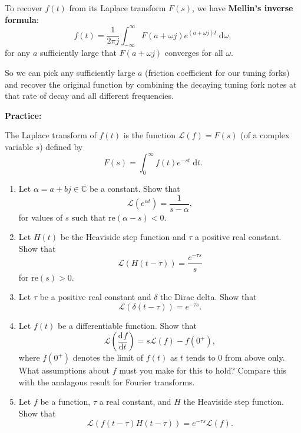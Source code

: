 \documentclass{article}
\newcommand{\deriv}[3][]{\frac{\mathrm{d}^{#1}#2}{\mathrm{d}#3^{#1}}}
\newcommand{\diff}{\;\mathrm{d}}
\begin{document}
To recover $f(t)$ from its Laplace transform $F(s)$, we have \textbf{Mellin's inverse formula}:
\[f(t)=\frac{1}{2\pi j}\int_{-\infty}^\infty F(a+\omega j)e^{(a+\omega j)t}\diff \omega,\]
for any $a$ sufficiently large that $F(a+\omega j)$ converges for all $\omega$.

So we can pick any sufficiently large $a$ (friction coefficient for our tuning forks) and recover the original function by combining the decaying tuning fork notes at that rate of decay and all different frequencies.


\clearpage
























\textbf{Practice:}\bigskip

The Laplace transform of $f(t)$ is the function $\mathcal{L}(f)=F(s)$ (of a complex variable $s$) defined by
\[F(s)=\int_0^\infty f(t)e^{-st}\diff t.\]

\begin{enumerate}
	\item Let $\alpha=a+bj\in\mathbb{C}$ be a constant. Show that
		\[\mathcal{L}\left(e^{\alpha t}\right)=\frac{1}{s-\alpha},\]
		for values of $s$ such that $\mathrm{re}(\alpha-s)<0$.
	\item Let $H(t)$ be the Heaviside step function and $\tau$ a positive real constant. Show that
		\[\mathcal{L}(H(t-\tau))=\frac{e^{-\tau s}}{s}\]
		for $\mathrm{re}(s)>0$.
	\item Let $\tau$ be a positive real constant and $\delta$ the Dirac delta. Show that
		\[\mathcal{L}(\delta(t-\tau))=e^{-\tau s}.\]
	\item Let $f(t)$ be a differentiable function. Show that
		\[\mathcal{L}\left(\deriv{f}{t}\right)=s\mathcal{L}(f) - f(0^+),\]
		where $f(0^+)$ denotes the limit of $f(t)$ as $t$ tends to 0 from above only. What assumptions about $f$ must you make for this to hold? Compare this with the analagous result for Fourier transforms.
	\item Let $f$ be a function, $\tau$ a real constant, and $H$ the Heaviside step function. Show that
		\[\mathcal{L}(f(t-\tau)H(t-\tau))=e^{-\tau s}\mathcal{L}(f).\]
\end{enumerate}
\end{document}
